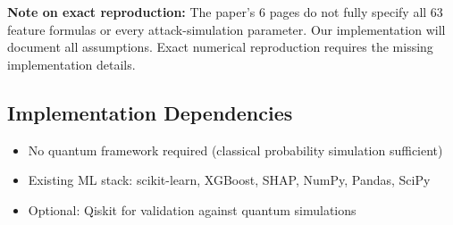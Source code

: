 \textbf{Note on exact reproduction:} The paper's 6 pages do not fully specify all 63 feature formulas or every attack-simulation parameter. Our implementation will document all assumptions. Exact numerical reproduction requires the missing implementation details.

\subsection{Implementation Dependencies}
\begin{itemize}
    \item No quantum framework required (classical probability simulation sufficient)
    \item Existing ML stack: scikit-learn, XGBoost, SHAP, NumPy, Pandas, SciPy
    \item Optional: Qiskit for validation against quantum simulations
\end{itemize}